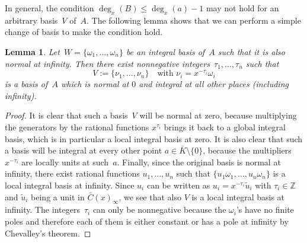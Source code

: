 \documentclass{sig-alternate}
\newtheorem{lemma}[theorem]{Lemma}
\let\set\mathbb
\begin{document}
In general, the condition $\deg_x(B) \leq \deg_x(a)-1$ may not hold for an arbitrary basis~$V$ of~$A$.
The following lemma shows that we can perform a simple change of basis to make the condition hold.

\begin{lemma}\label{LM:CB}
Let~$W =\{\omega_1, \ldots, \omega_n\}$ be an integral basis of~$A$ such that it is also normal at infinity. Then
there exist nonnegative integers~$\tau_1, \ldots, \tau_n$ such that
\[ V := \{\nu_1, \ldots, \nu_n\} \quad \text{with $\nu_i = x^{-\tau_i} \omega_i$}\]
is a basis of~$A$ which is normal at $0$ and integral at all other places (including infinity).
\end{lemma}
\begin{proof}
It is clear that such a basis~$V$ will be normal at zero, because multiplying the generators by
the rational functions $x^{\tau_i}$ brings it back to a global integral basis, which is in particular
a local integral basis at zero.
It is also clear that such a basis will be integral at every other point $a\in\bar K\setminus\{0\}$, because the
multipliers $x^{-\tau_i}$ are locally units at such~$a$.
Finally, since the original basis is normal at infinity, there exist rational functions $u_1,\dots,u_n$
such that $\{u_1\omega_1,\dots,u_n\omega_n\}$ is a local integral basis at infinity.
Since $u_i$ can be written as $u_i=x^{-\tau_i}\tilde{u}_i$ with $\tau_i\in\set Z$ and $\tilde{u}_i$ being a unit
in $\bar{C}(x)_\infty$, we see that also $V$ is a local integral basis at infinity.
The integers~$\tau_i$ can only be nonnegative because the $\omega_i$'s have no finite poles and therefore each
of them is either constant or has a pole at infinity by Chevalley's theorem.
\end{proof}
\end{document}
